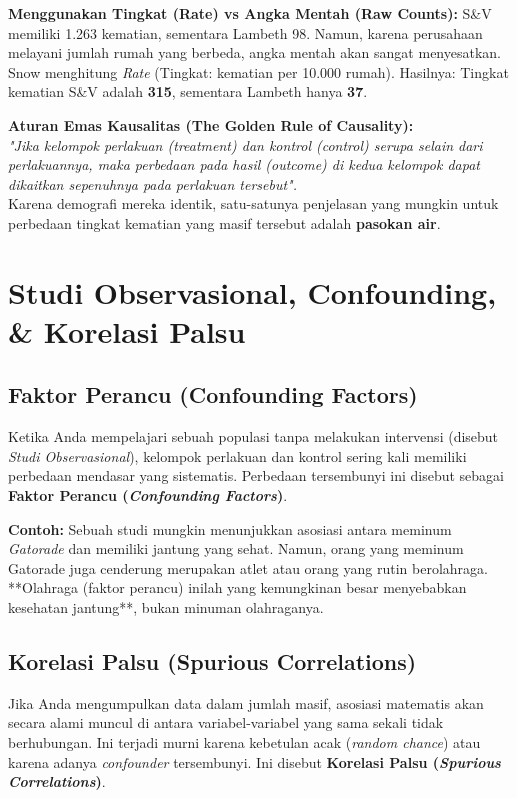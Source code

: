 \documentclass[12pt,a4paper]{article}
\begin{document}
\textbf{Menggunakan Tingkat (Rate) vs Angka Mentah (Raw Counts):} 
S\&V memiliki 1.263 kematian, sementara Lambeth 98. Namun, karena perusahaan melayani jumlah rumah yang berbeda, angka mentah akan sangat menyesatkan. Snow menghitung \textit{Rate} (Tingkat: kematian per 10.000 rumah). Hasilnya: Tingkat kematian S\&V adalah \textbf{315}, sementara Lambeth hanya \textbf{37}.

\begin{mdframed}[backgroundcolor=notebg, linecolor=noteframe, linewidth=2pt]
\textbf{Aturan Emas Kausalitas (The Golden Rule of Causality):} \\
\textit{"Jika kelompok perlakuan (treatment) dan kontrol (control) serupa selain dari perlakuannya, maka perbedaan pada hasil (outcome) di kedua kelompok dapat dikaitkan sepenuhnya pada perlakuan tersebut".} \\
Karena demografi mereka identik, satu-satunya penjelasan yang mungkin untuk perbedaan tingkat kematian yang masif tersebut adalah \textbf{pasokan air}.
\end{mdframed}

\newpage
\section{Studi Observasional, Confounding, \& Korelasi Palsu}


\subsection{Faktor Perancu (Confounding Factors)}
Ketika Anda mempelajari sebuah populasi tanpa melakukan intervensi (disebut \textit{Studi Observasional}), kelompok perlakuan dan kontrol sering kali memiliki perbedaan mendasar yang sistematis. Perbedaan tersembunyi ini disebut sebagai \textbf{Faktor Perancu (\textit{Confounding Factors})}.

\textbf{Contoh:} Sebuah studi mungkin menunjukkan asosiasi antara meminum \textit{Gatorade} dan memiliki jantung yang sehat. Namun, orang yang meminum Gatorade juga cenderung merupakan atlet atau orang yang rutin berolahraga. **Olahraga (faktor perancu) inilah yang kemungkinan besar menyebabkan kesehatan jantung**, bukan minuman olahraganya.

\subsection{Korelasi Palsu (Spurious Correlations)}
Jika Anda mengumpulkan data dalam jumlah masif, asosiasi matematis akan secara alami muncul di antara variabel-variabel yang sama sekali tidak berhubungan. Ini terjadi murni karena kebetulan acak (\textit{random chance}) atau karena adanya \textit{confounder} tersembunyi. Ini disebut \textbf{Korelasi Palsu (\textit{Spurious Correlations})}.
\end{document}
